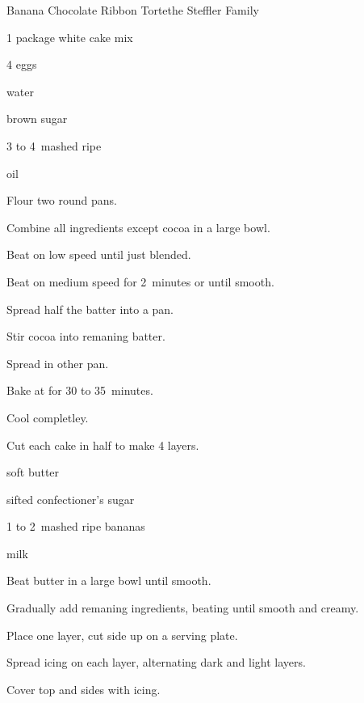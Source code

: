\begin{recipe}{Banana Chocolate Ribbon Torte}{the Steffler Family}{}

\begin{ingredients}
\item 1 package white cake mix
\item 4 eggs
\item \C{\half} water
\item \C{\quarter} 
\item {} brown sugar
\item 3 to 4~mashed ripe 
\item \C{\third} oil
\end{ingredients}

\begin{directions}
\item Flour two round pans.
\item Combine all ingredients except cocoa in a large bowl.
\item Beat on low speed until just blended.
\item Beat on medium speed for 2~minutes or until smooth.
\item Spread half the batter into a pan.
\item Stir cocoa into remaning batter.
\item Spread in other pan.
\item Bake at  for 30 to 35~minutes.
\item Cool completley.
\item Cut each cake in half to make 4 layers.
\end{directions}


\begin{ingredients}
\item \C{\half} soft butter
\item {} sifted confectioner's sugar
\item 1 to 2~mashed ripe bananas
\item {} milk
\end{ingredients}

\begin{directions}
\item Beat butter in a large bowl until smooth.
\item Gradually add remaning ingredients, beating until smooth and creamy.
\item Place one layer, cut side up on a serving plate.
\item Spread icing on each layer, alternating dark and light layers.
\item Cover top and sides with icing.
\end{directions}
\end{recipe}
